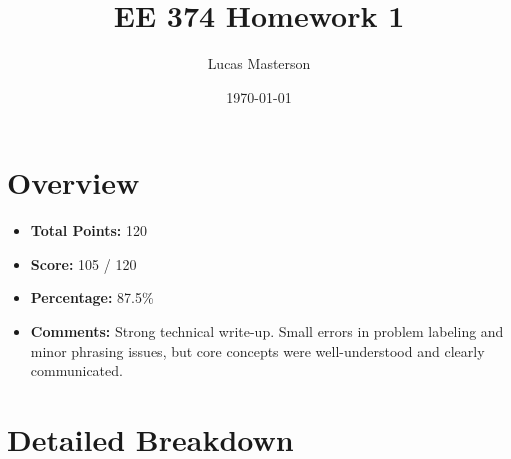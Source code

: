 \documentclass[11pt]{article}
\title{EE 374 Homework 1}
\author{Lucas Masterson}
\date{\today}
\begin{document}
\maketitle


\section*{Overview}
\begin{itemize}[leftmargin=1.5em]
    \item \textbf{Total Points:} 120
    \item \textbf{Score:} 105 / 120
    \item \textbf{Percentage:} 87.5\%
    \item \textbf{Comments:} Strong technical write-up. Small errors in problem labeling and minor phrasing issues, but core concepts were well-understood and clearly communicated.
\end{itemize}

\section*{Detailed Breakdown}
\end{document}
